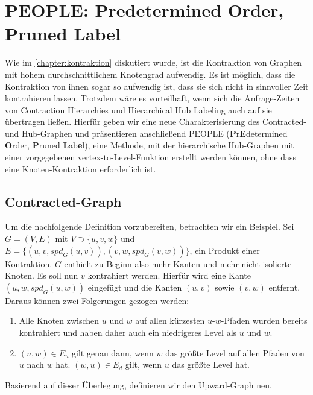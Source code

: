 \chapter{PEOPLE: Predetermined Order, Pruned Label}\label{chapter:people}

Wie im \autoref{chapter:kontraktion} diskutiert wurde, ist die Kontraktion von Graphen mit hohem durchschnittlichem Knotengrad aufwendig.
Es ist möglich, dass die Kontraktion von ihnen sogar so aufwendig ist, dass sie sich nicht in sinnvoller Zeit kontrahieren lassen.
Trotzdem wäre es vorteilhaft, wenn sich die Anfrage-Zeiten von Contraction Hierarchies und Hierarchical Hub Labeling auch auf sie übertragen ließen.
Hierfür geben wir eine neue Charakterisierung des Contracted- und Hub-Graphen und präsentieren anschließend PEOPLE (\textbf{P}r\textbf{E}determined \textbf{O}rder, \textbf{P}runed \textbf{L}ab\textbf{e}l), eine Methode, mit der hierarchische Hub-Graphen mit einer vorgegebenen vertex-to-Level-Funktion erstellt werden können, ohne dass eine Knoten-Kontraktion erforderlich ist.

\section{Contracted-Graph}

Um die nachfolgende Definition vorzubereiten, betrachten wir ein Beispiel.
Sei $G = (V, E)$ mit $V \supset \{ u, v, w \}$ und $E = \{ (u, v, {spd}_G (u, v)), (v, w, {spd}_G (v, w)) \}$, ein Produkt einer Kontraktion.
$G$ enthielt zu Beginn also mehr Kanten und mehr nicht-isolierte Knoten.
Es soll nun $v$ kontrahiert werden.
Hierfür wird eine Kante $(u, w, {spd}_G (u, w))$ eingefügt und die Kanten $(u, v)$ sowie $(v, w)$ entfernt.
Daraus können zwei Folgerungen gezogen werden:

\begin{enumerate}
  \item
        Alle Knoten zwischen $u$ und $w$ auf allen kürzesten $u$-$w$-Pfaden wurden bereits kontrahiert und haben daher auch ein niedrigeres Level als $u$ und $w$.

  \item
        $(u, w) \in E_u$ gilt genau dann, wenn $w$ das größte Level auf allen Pfaden von $u$ nach $w$ hat.
        $(w, u) \in E_d$ gilt, wenn $u$ das größte Level hat.
\end{enumerate}

Basierend auf dieser Überlegung, definieren wir den Upward-Graph neu.

